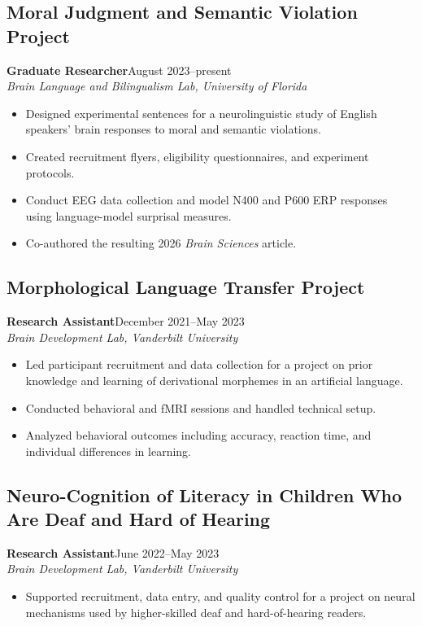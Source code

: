 \documentclass[11pt,letterpaper]{article}
\newcommand{\role}[3]{\textbf{#1}\hfill #2\\\textit{#3}\\}
\begin{document}
\subsection*{Moral Judgment and Semantic Violation Project}
\role{Graduate Researcher}{August 2023--present}{Brain Language and Bilingualism Lab, University of Florida}
\begin{itemize}
\item Designed experimental sentences for a neurolinguistic study of English speakers' brain responses to moral and semantic violations.
\item Created recruitment flyers, eligibility questionnaires, and experiment protocols.
\item Conduct EEG data collection and model N400 and P600 ERP responses using language-model surprisal measures.
\item Co-authored the resulting 2026 \textit{Brain Sciences} article.
\end{itemize}

\subsection*{Morphological Language Transfer Project}
\role{Research Assistant}{December 2021--May 2023}{Brain Development Lab, Vanderbilt University}
\begin{itemize}
\item Led participant recruitment and data collection for a project on prior knowledge and learning of derivational morphemes in an artificial language.
\item Conducted behavioral and fMRI sessions and handled technical setup.
\item Analyzed behavioral outcomes including accuracy, reaction time, and individual differences in learning.
\end{itemize}

\subsection*{Neuro-Cognition of Literacy in Children Who Are Deaf and Hard of Hearing}
\role{Research Assistant}{June 2022--May 2023}{Brain Development Lab, Vanderbilt University}
\begin{itemize}
\item Supported recruitment, data entry, and quality control for a project on neural mechanisms used by higher-skilled deaf and hard-of-hearing readers.
\end{itemize}
\end{document}
